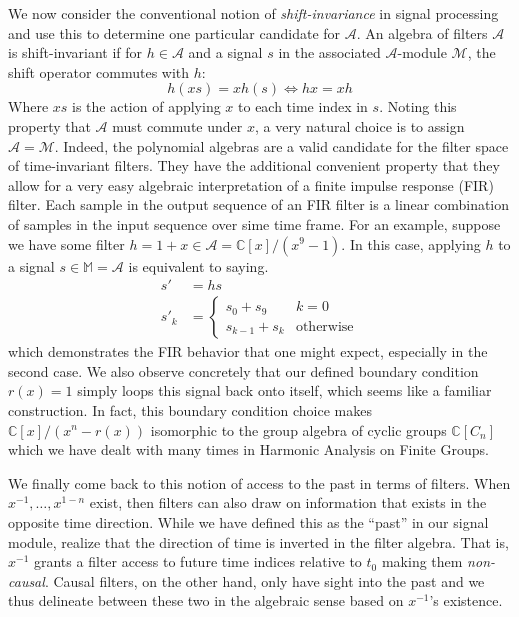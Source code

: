 \documentclass[12pt,technote]{IEEEtran}
\begin{document}
We now consider the conventional notion of \textit{shift-invariance} in signal processing and use this to determine one particular candidate for $\mathcal{A}$. An algebra of filters $\mathcal{A}$ is shift-invariant if for $h\in \mathcal{A}$ and a signal $s$ in the associated $\mathcal{A}$-module $\mathcal{M}$, the shift operator commutes with $h$:
\begin{equation*}
    h(xs) = xh(s) \iff hx = xh
\end{equation*}
Where $xs$ is the action of applying $x$ to each time index in $s$. Noting this property that $\mathcal{A}$ must commute under $x$, a very natural choice is to assign $\mathcal{A} = \mathcal{M}$. Indeed, the polynomial algebras are a valid candidate for the filter space of time-invariant filters. They have the additional convenient property that they allow for a very easy algebraic interpretation of a finite impulse response (FIR) filter. Each sample in the output sequence of an FIR filter is a linear combination of samples in the input sequence over sime time frame. For an example, suppose we have some filter $h = 1 + x\in \mathcal{A} = \mathbb{C}[x]/(x^{9} - 1)$. In this case, applying $h$ to a signal $s\in \mathbb{M} = \mathcal{A}$ is equivalent to saying.
\begin{align*}
    s' &= hs\\
    s'_k &= \begin{cases}
        s_0 + s_9 & k = 0\\
        s_{k-1} + s_k & \text{otherwise}       
    \end{cases}
\end{align*}
which demonstrates the FIR behavior that one might expect, especially in the second case. We also observe concretely that our defined boundary condition $r(x) = 1$ simply loops this signal back onto itself, which seems like a familiar construction. In fact, this boundary condition choice makes $\mathbb{C}[x]/(x^n - r(x))$ isomorphic to the group algebra of cyclic groups $\mathbb{C}[C_n]$ which we have dealt with many times in Harmonic Analysis on Finite Groups.

We finally come back to this notion of access to the past in terms of filters. When $x^{-1}, \dots, x^{1-n}$ exist, then filters can also draw on information that exists in the opposite time direction. While we have defined this as the ``past'' in our signal module, realize that the direction of time is inverted in the filter algebra. That is, $x^{-1}$ grants a filter access to future time indices relative to $t_0$ making them \textit{non-causal}. Causal filters, on the other hand, only have sight into the past and we thus delineate between these two in the algebraic sense based on $x^{-1}$'s existence.
\end{document}
